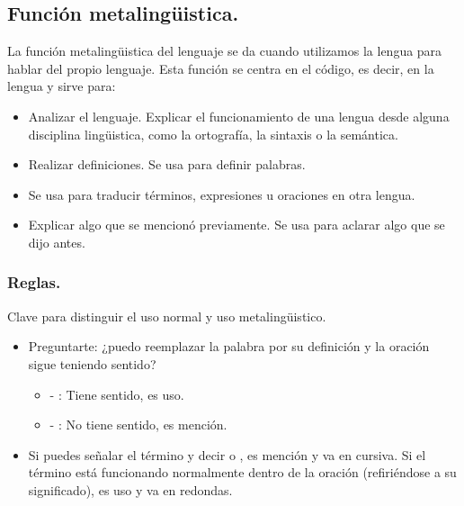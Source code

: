     \subsection{Función metalingüistica.}
    
    
    La función metalingüistica del lenguaje se da cuando utilizamos la lengua para hablar del propio lenguaje. Esta función se centra en el código, es decir, en la lengua y sirve para:
    
    \begin{itemize}
        \item Analizar el lenguaje. Explicar el funcionamiento de una lengua desde alguna disciplina lingüistica, como la ortografía, la sintaxis o la semántica.
        \item Realizar definiciones. Se usa para definir palabras.
        \item Se usa para traducir términos, expresiones u oraciones en otra lengua.
        \item Explicar algo que se mencionó previamente. Se usa para aclarar algo que se dijo antes.
    \end{itemize}
    
        \subsubsection{Reglas.}
        
        Clave para distinguir el uso normal y uso metalingüistico.
        
        \begin{itemize}
            \item Preguntarte: ¿puedo reemplazar la palabra por su definición y la oración sigue teniendo sentido?
            \begin{itemize}
                \item {} - : Tiene sentido, es uso.
                \item {} - : No tiene sentido, es mención.
            \end{itemize}
            \item Si puedes señalar el término y decir  o , es mención y va en cursiva. Si el término está funcionando normalmente dentro de la oración (refiriéndose a su significado), es uso y va en redondas.
        \end{itemize}
        
